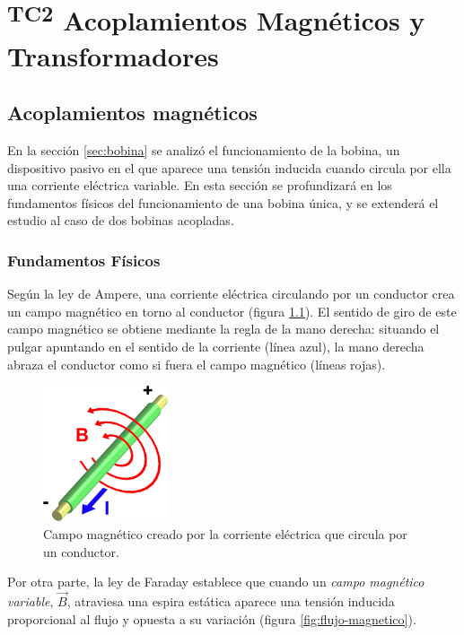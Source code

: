 \chapter{\textsuperscript{TC2} Acoplamientos Magnéticos y Transformadores}\label{chap:transformadores}

\section{Acoplamientos magnéticos}
\label{sec:acoplamientos}

En la sección \ref{sec:bobina} se analizó el funcionamiento de la bobina, un dispositivo pasivo en el que aparece una tensión inducida cuando circula por ella una corriente eléctrica variable. En esta sección se profundizará en los fundamentos físicos del funcionamiento de una bobina única, y se extenderá el estudio al caso de dos bobinas acopladas.

\subsection{Fundamentos Físicos}
\label{sec:fisica-bobina}

Según la ley de Ampere, una corriente eléctrica circulando por un conductor crea un campo magnético en torno al conductor (figura \ref{fig:ampere}). El sentido de giro de este campo magnético se obtiene mediante la regla de la mano derecha: situando el pulgar apuntando en el sentido de la corriente (línea azul), la mano derecha abraza el conductor como si fuera el campo magnético (líneas rojas).

\begin{figure}[H]
  \centering
  \begin{center}
    \includegraphics[height=4cm]{../figs/Electromagnetism.png}
  \end{center}
  \caption{Campo magnético creado por la corriente eléctrica que circula por un conductor.}
  \label{fig:ampere}
\end{figure}

Por otra parte, la ley de Faraday establece que cuando un \emph{campo magnético variable}, $\vec{B}$, atraviesa una espira estática aparece una tensión inducida proporcional al flujo y opuesta a su variación (figura \ref{fig:flujo-magnetico}).


